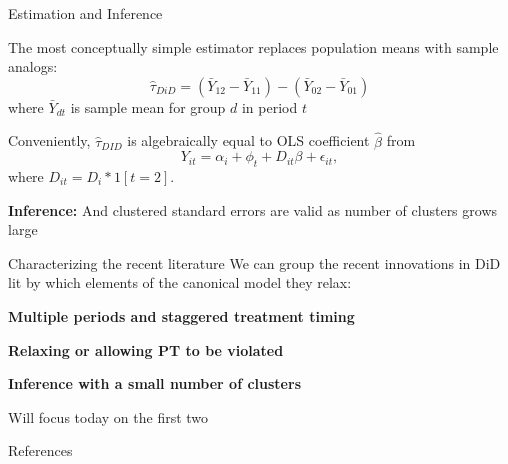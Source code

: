 \documentclass[aspectratio = 169, 12pt]{beamer}
\begin{document}
\begin{frame}{Estimation and Inference}
  \begin{wideitemize}
    \item
    The most conceptually simple estimator replaces population means with sample analogs:
    $$\hat{\tau}_{DiD} = (\bar{Y}_{12} - \bar{Y}_{11}) - (\bar{Y}_{02} - \bar{Y}_{01}) $$
    \noindent where $\bar{Y}_{dt}$ is sample mean for group $d$ in period $t$

    \pause
    \item
    Conveniently, $\hat\tau_{DID}$ is algebraically equal to OLS coefficient $\hat\beta$ from
    \begin{equation}
      Y_{it} = \alpha_i + \phi_t + D_{it} \beta  + \epsilon_{it}, \label{eqn: TWFE-2-periods}
    \end{equation}
    \noindent where $D_{it} = D_i * 1[t=2]$.
    \pause
    \item
    \textbf{Inference:} And clustered standard errors are valid as number of clusters grows large
  \end{wideitemize}
\end{frame}

\begin{frame}{Characterizing the recent literature}
  We can group the recent innovations in DiD lit by which elements of the canonical model they relax:
  \medskip

  \begin{wideitemize}
    \item
    \textbf{Multiple periods and staggered treatment timing}

    \item
    \textbf{Relaxing or allowing PT to be violated}

    \item
    \textbf{Inference with a small number of clusters}

  \end{wideitemize}
  \medskip
  Will focus today on the first two
\end{frame}

\backupbegin
\begin{frame}[allowframebreaks]{References}
  
\end{frame}
\backupend
\end{document}
